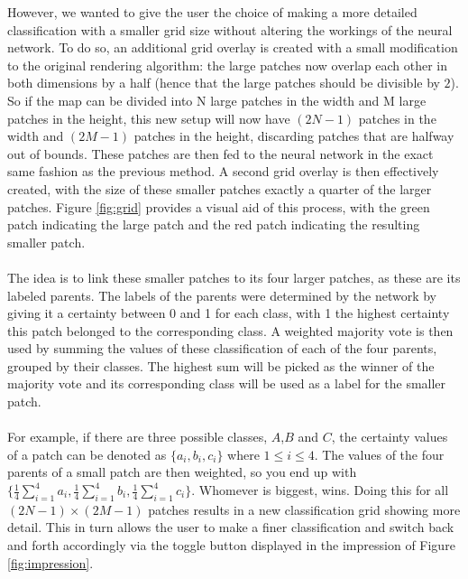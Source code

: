 \documentclass[a4paper,onecolumn]{report}
\begin{document}
However, we wanted to give the user the choice of making a more detailed classification with a smaller grid size without altering the workings of the neural network. To do so, an additional grid overlay is created with a small modification to the original rendering algorithm: the large patches now overlap each other in both dimensions by a half (hence that the large patches should be divisible by $2$). So if the map can be divided into N large patches in the width and M large patches in the height, this new setup will now have $(2N - 1)$ patches in the width and $(2M - 1)$ patches in the height, discarding patches that are halfway out of bounds. These patches are then fed to the neural network in the exact same fashion as the previous method. A second grid overlay is then effectively created, with the size of these smaller patches exactly a quarter of the larger patches. 
Figure \ref{fig:grid} provides a visual aid of this process, with the green patch indicating the large patch and the red patch indicating the resulting smaller patch.
\\\\
The idea is to link these smaller patches to its four larger patches, as these are its labeled parents. The labels of the parents were determined by the network by giving it a certainty between 0 and 1 for each class, with 1 the highest certainty this patch belonged to the corresponding class.
A weighted majority vote is then used by summing the values of these classification of each of the four parents, grouped by their classes. The highest sum will be picked as the winner of the majority vote and its corresponding class will be used as a label for the smaller patch.
\\\\
For example, if there are three possible classes, $A$,$B$ and $C$, the certainty values of a patch can be denoted as $\{a_i, b_i, c_i\}$ where $1 \leq i \leq 4$. The values of the four parents of a small patch are then weighted, so you end up with $\{ \frac{1}{4}\sum_{i=1}^{4} a_i, \frac{1}{4}\sum_{i=1}^{4} b_i, \frac{1}{4}\sum_{i=1}^{4} c_i\}$. Whomever is biggest, wins. Doing this for all $(2N - 1) \times (2M - 1)$ patches results in a new classification grid showing more detail. This in turn allows the user to make a finer classification and switch back and forth accordingly via the toggle button displayed in the impression of Figure \ref{fig:impression}.
\end{document}

